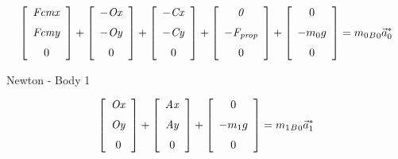 \begin{equation}\label{ne_b0}
  \left[ \begin {array}{c} {\it Fcmx}\\ \noalign{\medskip}{\it Fcmy}
\\ \noalign{\medskip}0\end {array} \right] 
+
 \left[ \begin {array}{c} {\it -Ox}\\ \noalign{\medskip}{\it -Oy}
\\ \noalign{\medskip}0\end {array} \right] 
+
 \left[ \begin {array}{c} {\it -Cx}\\ \noalign{\medskip}{\it -Cy}
\\ \noalign{\medskip}0\end {array} \right] 
+
\left[ \begin {array}{c} {\it 0}\\ \noalign{\medskip}{\it -F_{prop}}
\\ \noalign{\medskip}0\end {array} \right] 
+
 \left[ \begin {array}{c} 0\\ \noalign{\medskip}-m_{{0}}g
\\ \noalign{\medskip}0\end {array} \right] 
 = {m}_{0}{_B}_{0}\vec{a}_{0}^*
\end{equation}

Newton - Body 1

\begin{equation}\label{oxax}
  \left[ \begin {array}{c} {\it Ox}\\ \noalign{\medskip}{\it Oy}
\\ \noalign{\medskip}0\end {array} \right] 
+
 \left[ \begin {array}{c} {\it Ax}\\ \noalign{\medskip}{\it Ay}
\\ \noalign{\medskip}0\end {array} \right] 
+
 \left[ \begin {array}{c} 0\\ \noalign{\medskip}-m_{{1}}g
\\ \noalign{\medskip}0\end {array} \right] 
= {m}_{1} {_B}_{0}\vec{a}_{1}^*
\end{equation}

